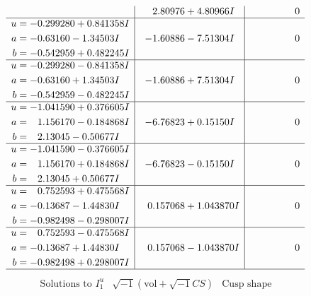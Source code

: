 \documentclass[1p]{elsarticle_modified}
\theoremstyle{definition}
\newcommand{\I}{\sqrt{-1}}
\begin{document}
$$\begin{array}{c|c|c}
 & \phantom{-}2.80976 + 4.80966 I & \phantom{-0.000000 } 0 \\ \hline\begin{aligned}
u &= -0.299280 + 0.841358 I \\
a &= -0.63160 - 1.34503 I \\
b &= -0.542959 + 0.482245 I\end{aligned}
 & -1.60886 - 7.51304 I & \phantom{-0.000000 } 0 \\ \hline\begin{aligned}
u &= -0.299280 - 0.841358 I \\
a &= -0.63160 + 1.34503 I \\
b &= -0.542959 - 0.482245 I\end{aligned}
 & -1.60886 + 7.51304 I & \phantom{-0.000000 } 0 \\ \hline\begin{aligned}
u &= -1.041590 + 0.376605 I \\
a &= \phantom{-}1.156170 - 0.184868 I \\
b &= \phantom{-}2.13045 - 0.50677 I\end{aligned}
 & -6.76823 + 0.15150 I & \phantom{-0.000000 } 0 \\ \hline\begin{aligned}
u &= -1.041590 - 0.376605 I \\
a &= \phantom{-}1.156170 + 0.184868 I \\
b &= \phantom{-}2.13045 + 0.50677 I\end{aligned}
 & -6.76823 - 0.15150 I & \phantom{-0.000000 } 0 \\ \hline\begin{aligned}
u &= \phantom{-}0.752593 + 0.475568 I \\
a &= -0.13687 - 1.44830 I \\
b &= -0.982498 - 0.298007 I\end{aligned}
 & \phantom{-}0.157068 + 1.043870 I & \phantom{-0.000000 } 0 \\ \hline\begin{aligned}
u &= \phantom{-}0.752593 - 0.475568 I \\
a &= -0.13687 + 1.44830 I \\
b &= -0.982498 + 0.298007 I\end{aligned}
 & \phantom{-}0.157068 - 1.043870 I & \phantom{-0.000000 } 0\\
 \hline 
 \end{array}$$\newpage$$\begin{array}{c|c|c}  
\text{Solutions to }I^u_{1}& \I (\text{vol} + \sqrt{-1}CS) & \text{Cusp shape}\\

\end{array}$$
\end{document}
